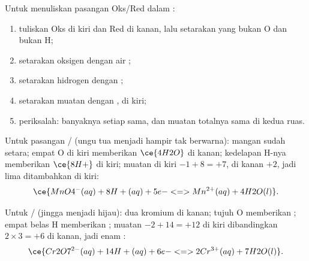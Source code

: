 \begin{method}\label{met:g11:redox:balance}
Untuk menuliskan  pasangan Oks/Red dalam :
\begin{enumerate}
  \item tuliskan Oks di kiri dan Red di kanan, lalu setarakan  yang
        bukan O dan bukan H;
  \item setarakan  oksigen dengan  air ;
  \item setarakan  hidrogen dengan  ;
  \item setarakan muatan dengan  , di kiri;
  \item periksalah: banyaknya setiap  sama, dan muatan totalnya sama
        di kedua ruas.
\end{enumerate}
\end{method}

\begin{example}\label{ex:g11:redox:permanganate}
Untuk pasangan / (ungu tua menjadi hampir tak
berwarna): mangan sudah setara; empat O di kiri memberikan
$\ce{4H2O}$ di kanan; kedelapan H-nya memberikan $\ce{8H+}$ di kiri;
muatan di kiri $-1 + 8 = +7$, di kanan $+2$, jadi lima 
ditambahkan di kiri:
\[
  \ce{MnO4^-(aq) + 8H+(aq) + 5e- <=> Mn^{2+}(aq) + 4H2O(l)}.
\]
\end{example}

\begin{example}\label{ex:g11:redox:dichromate}
Untuk / (jingga menjadi hijau): dua kromium di
kanan; tujuh O memberikan ; empat belas H memberikan
; muatan $-2 + 14 = +12$ di kiri dibandingkan $2 \times 3 = +6$
di kanan, jadi enam :
\[
  \ce{Cr2O7^{2-}(aq) + 14H+(aq) + 6e- <=> 2Cr^{3+}(aq) + 7H2O(l)}.
\]
\end{example}


